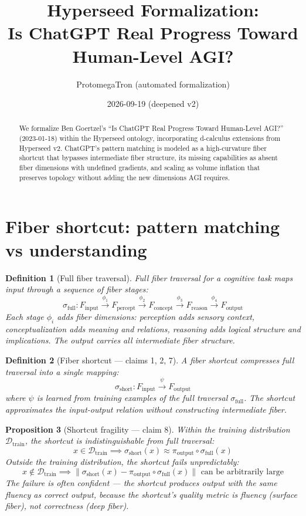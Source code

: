 \documentclass[11pt,a4paper]{article}
\title{Hyperseed Formalization:\\
  Is ChatGPT Real Progress Toward Human-Level AGI?}
\author{ProtomegaTron (automated formalization)}
\date{2026-09-19 (deepened v2)}
\newtheorem{definition}{Definition}[section]
\newtheorem{proposition}[definition]{Proposition}
\begin{document}
\maketitle

\begin{abstract}
We formalize Ben Goertzel's ``Is ChatGPT Real Progress Toward Human-Level
AGI?'' (2023-01-18) within the Hyperseed ontology, incorporating d-calculus
extensions from Hyperseed v2. ChatGPT's pattern matching is modeled as a
high-curvature fiber shortcut that bypasses intermediate fiber structure,
its missing capabilities as absent fiber dimensions with undefined gradients,
and scaling as volume inflation that preserves topology without adding the
new dimensions AGI requires.
\end{abstract}

\tableofcontents

\section{Fiber shortcut: pattern matching vs understanding}

\begin{definition}[Full fiber traversal]
\emph{Full fiber traversal} for a cognitive task maps input through a
sequence of fiber stages:
\[
  \sigma_{\text{full}}: F_{\text{input}} \xrightarrow{\phi_1}
    F_{\text{percept}} \xrightarrow{\phi_2} F_{\text{concept}}
    \xrightarrow{\phi_3} F_{\text{reason}} \xrightarrow{\phi_4}
    F_{\text{output}}
\]
Each stage $\phi_i$ adds fiber dimensions: perception adds sensory context,
conceptualization adds meaning and relations, reasoning adds logical
structure and implications. The output carries all intermediate fiber
structure.
\end{definition}

\begin{definition}[Fiber shortcut --- claims 1, 2, 7]
A \emph{fiber shortcut} compresses full traversal into a single mapping:
\[
  \sigma_{\text{short}}: F_{\text{input}} \xrightarrow{\psi}
    F_{\text{output}}
\]
where $\psi$ is learned from training examples of the full traversal
$\sigma_{\text{full}}$. The shortcut approximates the input-output
relation without constructing intermediate fiber.
\end{definition}

\begin{proposition}[Shortcut fragility --- claim 8]
\label{prop:fragility}
Within the training distribution $\mathcal{D}_{\text{train}}$, the shortcut
is indistinguishable from full traversal:
\[
  x \in \mathcal{D}_{\text{train}} \implies
  \sigma_{\text{short}}(x) \approx \pi_{\text{output}} \circ
    \sigma_{\text{full}}(x)
\]
Outside the training distribution, the shortcut fails unpredictably:
\[
  x \notin \mathcal{D}_{\text{train}} \implies
  \|\sigma_{\text{short}}(x) - \pi_{\text{output}} \circ
    \sigma_{\text{full}}(x)\| \text{ can be arbitrarily large}
\]
The failure is often \emph{confident} --- the shortcut produces output
with the same fluency as correct output, because the shortcut's quality
metric is fluency (surface fiber), not correctness (deep fiber).
\end{proposition}
\end{document}
